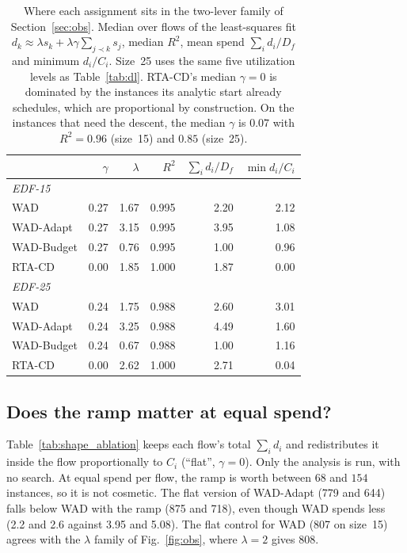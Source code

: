 \documentclass[conference]{IEEEtran}
\begin{document}
\begin{table}[t]
\centering
\caption{Where each assignment sits in the two-lever family of
Section~\ref{sec:obs}. Median over flows of the least-squares fit
$d_k\approx\lambda s_k+\lambda\gamma\sum_{j\prec k}s_j$, median $R^2$, mean
spend $\sum_i d_i/D_f$ and minimum $d_i/C_i$. Size~25 uses the same five
utilization levels as Table~\ref{tab:dl}. RTA-CD's median $\gamma=0$ is dominated
by the instances its analytic start already schedules, which are proportional by
construction. On the instances that need the descent, the median $\gamma$ is
$0.07$ with $R^2=0.96$ (size~15) and $0.85$ (size~25).}
\label{tab:shape}
\begin{tabular}{lrrrrr}
\toprule
 & $\gamma$ & $\lambda$ & $R^2$ & $\sum_i d_i/D_f$ & $\min d_i/C_i$ \\
\midrule
\multicolumn{6}{l}{\emph{EDF-15}}\\
WAD          & 0.27 & 1.67 & 0.995 & 2.20 & 2.12 \\
WAD-Adapt    & 0.27 & 3.15 & 0.995 & 3.95 & 1.08 \\
WAD-Budget   & 0.27 & 0.76 & 0.995 & 1.00 & 0.96 \\
RTA-CD       & 0.00 & 1.85 & 1.000 & 1.87 & 0.00 \\
\midrule
\multicolumn{6}{l}{\emph{EDF-25}}\\
WAD          & 0.24 & 1.75 & 0.988 & 2.60 & 3.01 \\
WAD-Adapt    & 0.24 & 3.25 & 0.988 & 4.49 & 1.60 \\
WAD-Budget   & 0.24 & 0.67 & 0.988 & 1.00 & 1.16 \\
RTA-CD       & 0.00 & 2.62 & 1.000 & 2.71 & 0.04 \\
\bottomrule
\end{tabular}
\end{table}

\subsection{Does the ramp matter at equal spend?}
Table~\ref{tab:shape_ablation} keeps each flow's total $\sum_i d_i$ and
redistributes it inside the flow proportionally to $C_i$ (``flat'', $\gamma=0$).
Only the analysis is run, with no search. At equal spend per flow, the ramp is
worth between $68$ and $154$ instances, so it is not cosmetic. The flat version of
WAD-Adapt (779 and 644) falls below WAD with the ramp (875 and 718), even though
WAD spends less (2.2 and 2.6 against 3.95 and 5.08). The flat control for WAD (807
on size~15) agrees with the $\lambda$ family of Fig.~\ref{fig:obs}, where
$\lambda=2$ gives 808.
\end{document}
